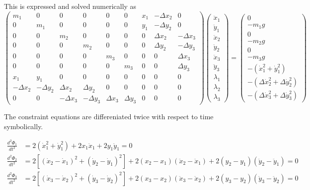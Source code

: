 This is expressed and solved numerically as
\begin{equation}
    \begin{pmatrix}
    m_1 & 0 & 0 & 0 & 0 & 0 & x_1 & -\Delta x_2 & 0 \\
    0 & m_1 & 0 & 0 & 0 & 0 & y_1 & -\Delta y_2 & 0 \\
    0 & 0 & m_2 & 0 & 0 & 0 & 0 & \Delta x_2 & -\Delta x_3 \\
    0 & 0 & 0 & m_2 & 0 & 0 & 0 & \Delta y_2 & -\Delta y_3 \\
    0 & 0 & 0 & 0 & m_3 & 0 & 0 & 0 & \Delta x_3 \\
    0 & 0 & 0 & 0 & 0 & m_3 & 0 & 0 & \Delta y_3 \\
    x_1 & y_1 & 0 & 0 & 0 & 0 & 0 & 0 & 0 \\
    -\Delta x_2 & -\Delta y_2 & \Delta x_2 & \Delta y_2 & 0 & 0 & 0 & 0 & 0 \\
    0 & 0 & -\Delta x_3 & -\Delta y_3 & \Delta x_3 & \Delta y_3 & 0 & 0 & 0
    \end{pmatrix}
    \begin{pmatrix}
    \ddot{x}_1 \\
    \ddot{y}_1 \\
    \ddot{x}_2 \\
    \ddot{y}_2 \\
    \ddot{x}_3 \\
    \ddot{y}_3 \\
    \lambda_1 \\
    \lambda_2 \\
    \lambda_3
    \end{pmatrix}
    =
    \begin{pmatrix}
    0 \\
    -m_1 g \\
    0 \\
    -m_2 g \\
    0 \\
    -m_3 g \\
    -(\dot{x}_1^2 + \dot{y}_1^2) \\
    -(\Delta \dot{x}_2^2 + \Delta \dot{y}_2^2) \\
    -(\Delta \dot{x}_3^2 + \Delta \dot{y}_3^2)
    \end{pmatrix}
\end{equation}

The constraint equations are differeniated twice with respect to time symbolically.

\begin{align}
\frac{d^2\Phi_1}{dt^2} &= 2\left(\dot{x}_1^2 + \dot{y}_1^2\right) + 2 x_1 \ddot{x}_1 + 2 y_1 \ddot{y}_1 = 0 \\[1.5ex]
\frac{d^2\Phi_2}{dt^2} &= 2\left[\left(\dot{x}_2 - \dot{x}_1\right)^2 + \left(\dot{y}_2 - \dot{y}_1\right)^2\right] + 2(x_2 - x_1)(\ddot{x}_2 - \ddot{x}_1) + 2(y_2 - y_1)(\ddot{y}_2 - \ddot{y}_1) = 0 \\[1.5ex]
\frac{d^2\Phi_3}{dt^2} &= 2\left[\left(\dot{x}_3 - \dot{x}_2\right)^2 + \left(\dot{y}_3 - \dot{y}_2\right)^2\right] + 2(x_3 - x_2)(\ddot{x}_3 - \ddot{x}_2) + 2(y_3 - y_2)(\ddot{y}_3 - \ddot{y}_2) = 0
\end{align}

